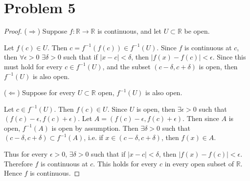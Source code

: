 \documentclass{article}
\newcommand{\R}{\mathbb{R}} %
\begin{document}
\section*{Problem 5}
\begin{proof}
	($\Rightarrow$) Suppose $f: \R \to \R$ is continuous, and let $U \subset \R$ be open.
	
	Let $f(c) \in U$. Then $c = f^{-1}(f(c)) \in f^{-1}(U)$. Since $f$ is continuous at $c$, then $\forall \epsilon > 0$ $\exists \delta >0$ such that if $|x - c| < \delta$, then $|f(x) - f(c)| < \epsilon$. Since this must hold for every $c \in f^{-1}(U)$, and the subset $(c - \delta, c + \delta)$ is open, then $f^{-1}(U)$ is also open.
	
	($\Leftarrow$) Suppose for every $U \subset \R$ open, $f^{-1}(U)$ is also open. 
	
	Let $c \in f^{-1}(U)$. Then $f(c) \in U$. Since $U$ is open, then $\exists \epsilon > 0$ such that $(f(c) - \epsilon, f(c) + \epsilon)$.
	Let $A = (f(c) - \epsilon, f(c) + \epsilon)$. Then since $A$ is open, $f^{-1}(A)$ is open by assumption. Then $\exists \delta > 0$ such that $(c - \delta, c + \delta) \subset f^{-1}(A)$, i.e. if $x \in (c - \delta, c + \delta)$, then $f(x) \in A$.
	
	Thus for every $\epsilon > 0$, $\exists \delta > 0$ such that if $|x - c| < \delta$, then $|f(x) - f(c)| < \epsilon$. Therefore $f$ is continuous at $c$. This holds for every $c$ in every open subset of $\R$. Hence $f$ is continuous.
\end{proof}
\end{document}

